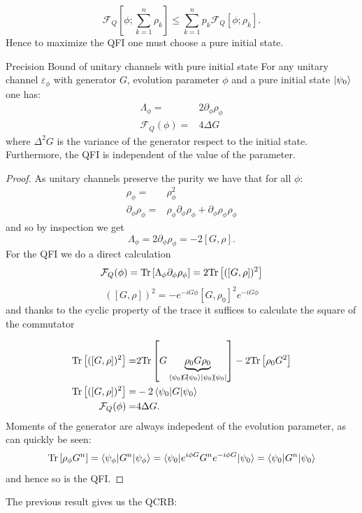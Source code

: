 \begin{equation}
  \mathcal{F}_{Q}[\phi; \sum_{k=1}^{n}\rho_{k}] \leq \sum_{k=1}^{n}p_{k}\mathcal{F}_{Q}[\phi; \rho_{k}].
\end{equation}
Hence to maximize the QFI one must choose a pure initial state.

\begin{theorem}Precision Bound of unitary channels with pure initial state
  For any unitary channel $\varepsilon_{\phi}$ with generator $G$, evolution parameter $\phi$ and a pure initial state $\ket{\psi_{0}}$ one has:
  \begin{align}
    \Lambda_{\phi} =& 2 \partial_{\phi}\rho_{\phi}\\
    \mathcal{F}_{Q}(\phi) =& 4 \Delta G
  \end{align}
  where $\Delta^2G$ is the variance of the generator respect to the
  initial state. Furthermore, the QFI is independent of the value
  of the parameter.
\end{theorem}

\begin{proof}
  As unitary channels preserve the purity we have that for all $\phi$:
  \begin{align}
    \rho_{\phi} =& \rho_{\phi}^{2}\\
    \partial_{\phi}\rho_{\phi}  =& \rho_{\phi}\partial_{\phi}\rho_{\phi} +\partial_{\phi}\rho_{\phi} \rho_{\phi}
  \end{align}
  and so by inspection we get
  \begin{equation}
    \Lambda_{\phi} = 2\partial_{\phi}\rho_{\phi} = -2[ G, \rho ].
  \end{equation}
  For the QFI we do a direct calculation
  \begin{equation}
    \mathcal{F}_{Q}(\phi) = \mathrm{Tr}\left[\Lambda_{\phi}\partial_{\phi}\rho_{\phi}\right]= 2\mathrm{Tr}\left[([G, \rho ])^{2}\right]
  \end{equation}
\begin{equation}
     ([G, \rho ])^{2}= -e^{-iG\phi}[G, \rho_{0}]^{2}e^{-iG\phi}
\end{equation}
and thanks to the cyclic property of the trace it suffices to calculate the square of the commutator

\begin{align}
\Tr{([G, \rho ])^{2}}=& 2\Tr{G\underbrace{\rho_{0}G\rho_{0}}_{\expectation{\psi_{0}}{G}\ketbra{\psi_{0}}}} - 2\Tr{\rho_{0}G^{2}}\\
  \Tr{([G, \rho ])^{2}}=&-2\expectation{\psi_{0}}{G}\\
  \mathcal{F}_{Q}(\phi) =&  4 \Delta G.
\end{align}
Moments of the generator are always indepedent of the evolution parameter, as can quickly be seen:
\begin{equation}
  \Tr{\rho_{\phi}G^{n}}= \expectation{\psi_{\phi}}{G^{n}}= \expectation{\psi_{0}}{e^{i\phi G}G^{n}e^{-i\phi G}} = \expectation{\psi_{0}}{ G^{n}}
\end{equation}
and hence so is the QFI.
\end{proof}
The previous result gives us the QCRB:

